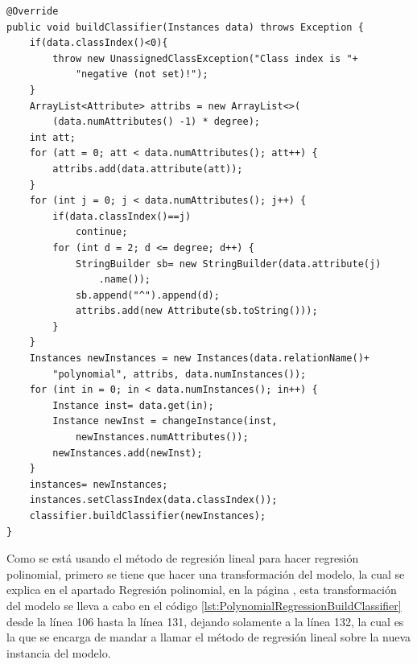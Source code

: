 
\begin{lstlisting}[frame=single]  
@Override
public void buildClassifier(Instances data) throws Exception {
	if(data.classIndex()<0){
		throw new UnassignedClassException("Class index is "+
			"negative (not set)!");
	}
	ArrayList<Attribute> attribs = new ArrayList<>(
		(data.numAttributes() -1) * degree);
	int att;
	for (att = 0; att < data.numAttributes(); att++) {
		attribs.add(data.attribute(att));
	}
	for (int j = 0; j < data.numAttributes(); j++) {
		if(data.classIndex()==j)
			continue;
		for (int d = 2; d <= degree; d++) {
			StringBuilder sb= new StringBuilder(data.attribute(j)
				.name());
			sb.append("^").append(d);
			attribs.add(new Attribute(sb.toString()));
		}
	}
	Instances newInstances = new Instances(data.relationName()+
		"polynomial", attribs, data.numInstances());
	for (int in = 0; in < data.numInstances(); in++) {
		Instance inst= data.get(in);
		Instance newInst = changeInstance(inst, 
			newInstances.numAttributes());
		newInstances.add(newInst);
	}
	instances= newInstances;
	instances.setClassIndex(data.classIndex());
	classifier.buildClassifier(newInstances);
}
\end{lstlisting}

Como se está usando el método de regresión lineal para hacer regresión polinomial, primero se tiene que hacer una transformación del modelo, la cual se explica en el apartado Regresión polinomial, en la página \pageref{subsec:regresionPolinomial},
esta transformación del modelo se lleva a cabo en el código \ref{lst:PolynomialRegressionBuildClassifier} desde la línea 106 hasta la línea 131, dejando solamente a la línea 132, la cual es la que se encarga de mandar a llamar el método de regresión lineal sobre la nueva instancia del modelo.

